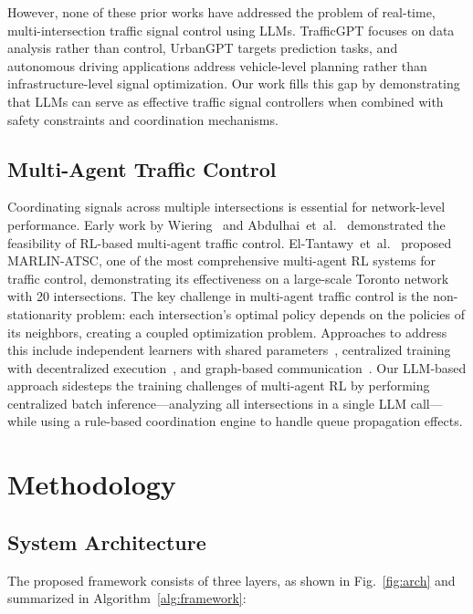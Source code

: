 \documentclass[conference]{IEEEtran}
\begin{document}
However, none of these prior works have addressed the problem of real-time, multi-intersection traffic signal control using LLMs. TrafficGPT focuses on data analysis rather than control, UrbanGPT targets prediction tasks, and autonomous driving applications address vehicle-level planning rather than infrastructure-level signal optimization. Our work fills this gap by demonstrating that LLMs can serve as effective traffic signal controllers when combined with safety constraints and coordination mechanisms.

\subsection{Multi-Agent Traffic Control}
Coordinating signals across multiple intersections is essential for network-level performance. Early work by Wiering~\cite{wiering2000} and Abdulhai~et~al.~\cite{abdulhai2003} demonstrated the feasibility of RL-based multi-agent traffic control. El-Tantawy~et~al.~\cite{eltantawy2013marlin} proposed MARLIN-ATSC, one of the most comprehensive multi-agent RL systems for traffic control, demonstrating its effectiveness on a large-scale Toronto network with 20 intersections. The key challenge in multi-agent traffic control is the non-stationarity problem: each intersection's optimal policy depends on the policies of its neighbors, creating a coupled optimization problem. Approaches to address this include independent learners with shared parameters~\cite{chu2020}, centralized training with decentralized execution~\cite{chen2020mplight}, and graph-based communication~\cite{wei2019colight}. Our LLM-based approach sidesteps the training challenges of multi-agent RL by performing centralized batch inference---analyzing all intersections in a single LLM call---while using a rule-based coordination engine to handle queue propagation effects.


\section{Methodology}
\label{sec:method}

\subsection{System Architecture}
The proposed framework consists of three layers, as shown in Fig.~\ref{fig:arch} and summarized in Algorithm~\ref{alg:framework}:
\end{document}
